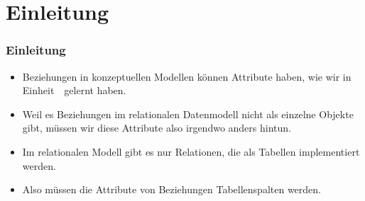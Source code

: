 \documentclass[aspectratio=169,mathserif,notheorems]{beamer}%
\subtitle{39.~Logisches Schema:~Beziehungsattribute}%
\begin{document}
%
%
\startPresentation%
%
\section{Einleitung}%
%
\begin{frame}%
\frametitle{Einleitung}%
\begin{itemize}%
%
\item Beziehungen in konzeptuellen Modellen können Attribute haben, wie wir in Einheit~\unitConceptualRelationships\ gelernt haben.%
%
\item<2-> Weil es Beziehungen im relationalen Datenmodell nicht als einzelne Objekte gibt, müssen wir diese Attribute also irgendwo anders hintun.%
%
\item<3-> Im relationalen Modell gibt es nur Relationen, die als Tabellen implementiert werden.%
%
\item<4-> Also müssen die Attribute von Beziehungen Tabellenspalten werden.%
\end{itemize}%
\end{frame}%
%
\end{document}
